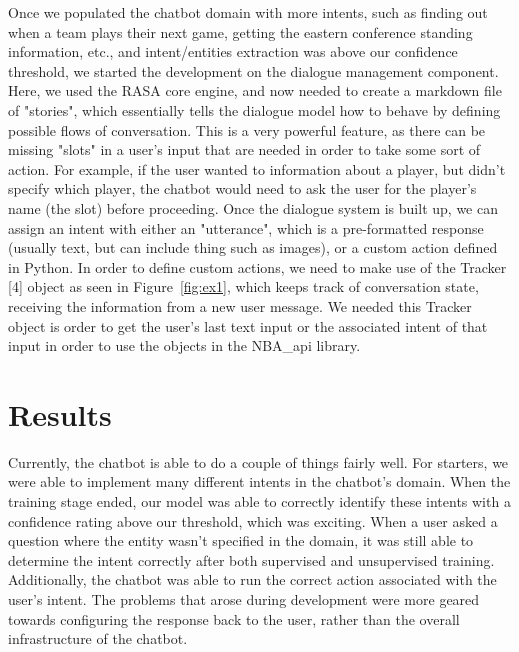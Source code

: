 \documentclass[conference]{IEEEtran}
\begin{document}
Once we populated the chatbot domain with more intents, such as finding out when a team plays their next game, getting the eastern conference standing information, etc., and intent/entities extraction was above our confidence threshold, we started the development on the dialogue management component. Here, we used the RASA core engine, and now needed to create a markdown file of "stories", which essentially tells the dialogue model how to behave by defining possible flows of conversation. This is a very powerful feature, as there can be missing "slots" in a user's input that are needed in order to take some sort of action. For example, if the user wanted to information about a player, but didn't specify which player, the chatbot would need to ask the user for the player's name (the slot) before proceeding. Once the dialogue system is built up, we can assign an intent with either an "utterance", which is a pre-formatted response (usually text, but can include thing such as images), or a custom action defined in Python. In order to define custom actions, we need to make use of the Tracker [4] object as seen in Figure~\ref{fig:ex1}, which keeps track of conversation state, receiving the information from a new user message. We needed this Tracker object is order to get the user's last text input or the associated intent of that input in order to use the objects in the NBA\_api library.

\section*{Results}
Currently, the chatbot is able to do a couple of things fairly well. For starters, we were able to implement many different intents in the chatbot's domain. When the training stage ended, our model was able to correctly identify these intents with a confidence rating above our threshold, which was exciting. When a user asked a question where the entity wasn't specified in the domain, it was still able to determine the intent correctly after both supervised and unsupervised training. Additionally, the chatbot was able to run the correct action associated with the user's intent. The problems that arose during development were more geared towards configuring the response back to the user, rather than the overall infrastructure of the chatbot.
\end{document}
